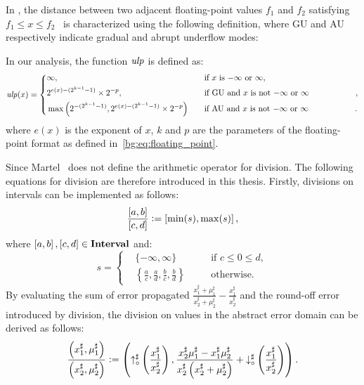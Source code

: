 In \soap{}, the distance between two adjacent floating-point values $f_1$ and
$f_2$ satisfying $f_1 \leq x \leq f_2$~\cite{goldberg} is characterized using
the following definition, where GU and AU respectively indicate gradual and
abrupt underflow modes:
\begin{definition}
    In our analysis, the function $\operatorname{\mathit{ulp}}$ is defined as:
    \begin{equation}
        \ulp(x) = \left\{
            \begin{aligned}
                & \infty,  && \text{if $x$ is $-\infty$ or $\infty$}, \\
                & 2^{e(x) - (2^{k - 1} - 1)} \times 2^{-p},
                \quad && \text{%
                    if GU and $x$ is not $-\infty$ or $\infty$
                }, \\
                & \max\left(
                    2^{-(2^{k-1} - 1)},
                    2^{e(x) - (2^{k - 1} - 1)} \times 2^{-p}
                \right) \quad && \text{%
                    if AU and $x$ is not $-\infty$ or $\infty$
                }.
            \end{aligned}
        \right.
    \end{equation}
    where $e(x)$ is the exponent of $x$, $k$ and $p$ are the parameters of the
    floating-point format as defined in~\eqref{bg:eq:floating_point}.
    {}\label{so:def:ulp}
\end{definition}

Since Martel~\cite{martel07} does not define the arithmetic operator for
division.  The following equations for division are therefore introduced in
this thesis.  Firstly, divisions on intervals can be implemented as follows:
\begin{equation}
    \frac{\left[{a}, {b}\right]}{\left[{c}, {d}\right]}
        \vcentcolon= \left[{\min(s)}, {\max(s)}\right],
\end{equation}
where $\left[{a}, {b}\right], \left[{c}, {d}\right] \in \mathbf{Interval}$ and:
\begin{equation}
    s = \left\{
    \begin{aligned}
        & \{ -\infty, \infty \}
            && \text{if~} c \leq 0 \leq d, \\
        & \left\{
            \frac{a}{c}, \frac{a}{d}, \frac{b}{c}, \frac{b}{d}
        \right\}
            \quad && \text{otherwise}.
    \end{aligned}
    \right.
\end{equation}
By evaluating the sum of error propagated $\frac{ x^\sharp_1 + \mu^\sharp_1 }{
x^\sharp_2 + \mu^\sharp_2 } - \frac{x^\sharp_1}{x^\sharp_2}$ and the round-off
error introduced by division, the division on values in the abstract error
domain can be derived as follows:
\begin{equation}
    \frac{
        \left( x^\sharp_1, \mu^\sharp_1 \right)
    }{
        \left( x^\sharp_2, \mu^\sharp_2 \right)
    }
    \vcentcolon= \left(
            \operatorname{\uparrow^\sharp_\circ}\left(\frac{x^\sharp_1}{x^\sharp_2}\right),
            \frac{
                x^\sharp_2 \mu^\sharp_1 - x^\sharp_1 \mu^\sharp_2
            }{
                x^\sharp_2 \left( x^\sharp_2 + \mu^\sharp_2 \right)
            } + \operatorname{\downarrow^\sharp_\circ}\left(\frac{x^\sharp_1}{x^\sharp_2}\right)
        \right).
\end{equation}

